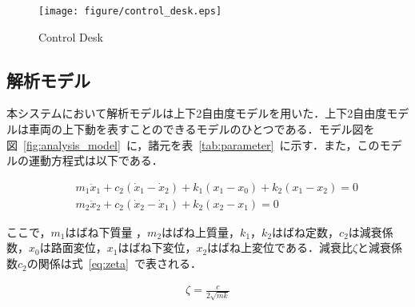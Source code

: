 \documentclass[a4paper,12pt]{article_vdlab_sotsuron}
\begin{document}
 \vspace{10mm}
\begin{figure}[h]
  \centering
  \texttt{[image: figure/control\_desk.eps]}
  \vspace{2mm}
   \caption{Control Desk}
  \label{fig:control_desk}
\end{figure}

\newpage
\subsection{解析モデル}
本システムにおいて解析モデルは上下2自由度モデルを用いた．上下2自由度モデルは車両の上下動を表すことのできるモデルのひとつである\cite{7}．モデル図を図~\ref{fig:analysis_model}~に，諸元を表~\ref{tab:parameter}~に示す．また，このモデルの運動方程式は以下である．

\begin{eqnarray}
 \label{eq:2dof_m1} &&m_1\ddot x_1 + c_2(\dot x_1-\dot x_2) + k_1(x_1-x_0) + k_2(x_1-x_2) = 0\\
 \label{eq:2dof_m2} &&m_2\ddot x_2 + c_2(\dot x_2-\dot x_1) + k_2(x_2-x_1) = 0
\end{eqnarray}

\vspace{10mm}
ここで，$m_1$はばね下質量 ，$m_2$はばね上質量，$k_1$，$k_2$はばね定数，$c_2$は減衰係数，$x_0$は路面変位，$x_1$はばね下変位，$x_2$はばね上変位である．減衰比$\zeta$と減衰係数$c_2$の関係は式~\ref{eq:zeta}~で表される．

\vspace{10mm}
\begin{eqnarray}
 \label{eq:zeta} \zeta = \frac{c}{2\sqrt{mk}}
\end{eqnarray}
\end{document}
